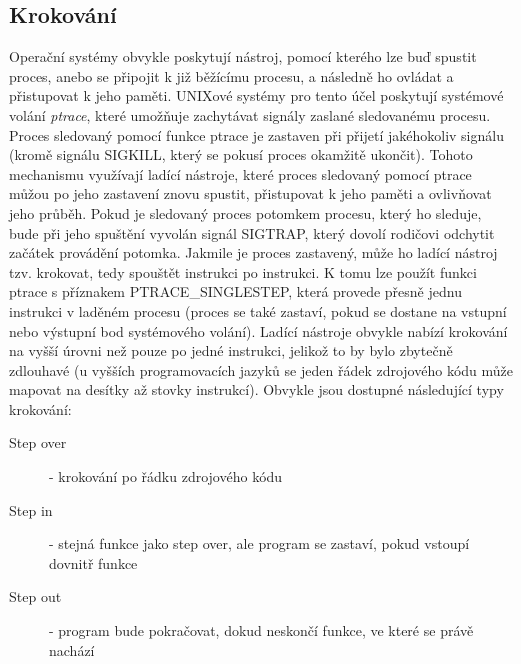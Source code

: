 \documentclass[bc,male,java,dept460]{diploma}						%
\begin{document}
	\subsection{Krokování}
		Operační systémy obvykle poskytují nástroj, pomocí kterého lze buď spustit proces, anebo se připojit k již běžícímu procesu, a následně ho ovládat
		a přistupovat k jeho paměti. UNIXové systémy pro tento účel poskytují systémové volání \emph{ptrace}\cite{ptrace}, které umožňuje zachytávat signály
		zaslané sledovanému procesu. Proces sledovaný pomocí funkce ptrace je zastaven při přijetí jakéhokoliv signálu (kromě signálu SIGKILL, který se pokusí proces
		okamžitě ukončit). Tohoto mechanismu využívají ladící nástroje, které proces sledovaný pomocí ptrace můžou po jeho zastavení znovu spustit,
		přistupovat k jeho paměti a ovlivňovat jeho průběh. Pokud je sledovaný proces potomkem procesu, který ho sleduje, bude při jeho spuštění vyvolán
		signál SIGTRAP, který dovolí rodičovi odchytit začátek provádění potomka. Jakmile je proces zastavený, může ho ladící nástroj tzv. krokovat, tedy spouštět
		instrukci po instrukci. K tomu lze použít funkci ptrace s příznakem PTRACE\_SINGLESTEP, která provede přesně jednu instrukci v laděném procesu (proces se také
		zastaví, pokud se dostane na vstupní nebo výstupní bod systémového volání)\cite{ptrace}. Ladící nástroje obvykle nabízí krokování na vyšší úrovni než
		pouze po jedné instrukci, jelikož to by bylo zbytečně zdlouhavé (u vyšších programovacích jazyků se jeden řádek zdrojového kódu může mapovat na desítky
		až stovky instrukcí). Obvykle jsou dostupné následující typy krokování:
		\begin{description}
			\item[Step over] - krokování po řádku zdrojového kódu
			\item[Step in] - stejná funkce jako step over, ale program se zastaví, pokud vstoupí dovnitř funkce
			\item[Step out] - program bude pokračovat, dokud neskončí funkce, ve které se právě nachází
		\end{description}
		
\end{document}

